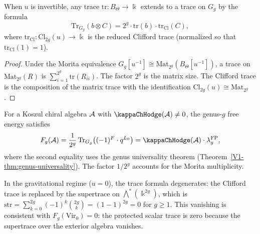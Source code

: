 \begin{proposition}
When $u$ is invertible, any trace $\mathrm{tr}\colon B_\Theta \to \Bbbk$
extends to a trace on $G_g$ by the formula
\begin{equation}%
\mathrm{Tr}_{G_g}(b \otimes C) =
2^g \cdot \mathrm{tr}(b) \cdot \mathrm{tr}_{\mathrm{Cl}}(C),
\end{equation}
where $\mathrm{tr}_{\mathrm{Cl}}\colon \mathrm{Cl}_{2g}(u)
\to \Bbbk$ is the reduced Clifford trace (normalized so that
$\mathrm{tr}_{\mathrm{Cl}}(1) = 1$).
\end{proposition}

\begin{proof}
Under the Morita equivalence
$G_g[u^{-1}] \cong \mathrm{Mat}_{2^g}(B_\Theta[u^{-1}])$, a trace on
$\mathrm{Mat}_{2^g}(R)$ is $\sum_{i=1}^{2^g}\mathrm{tr}(R_{ii})$.
The factor $2^g$ is the matrix size. The Clifford trace is the
composition of the matrix trace with the identification
$\mathrm{Cl}_{2g}(u) \cong \mathrm{Mat}_{2^g}$.
\end{proof}

\begin{corollary}
For a Koszul chiral algebra $\mathcal{A}$ with $\kappaChHodge(\cA) \neq 0$, the
genus-$g$ free energy satisfies
\begin{equation}%
F_g(\cA) = \frac{1}{2^g}\,\mathrm{Tr}_{G_g}\bigl(
(-1)^F \cdot q^{L_0}\bigr)
= \kappaChHodge(\cA) \cdot \lambda_g^{\mathrm{FP}},
\end{equation}
where the second equality uses the genus universality theorem
(Theorem~\ref{V1-thm:genus-universality}). The factor $1/2^g$ accounts
for the Morita multiplicity.
\end{corollary}

\begin{remark}[The partition function at $u = 0$]
In the gravitational regime ($u = 0$), the trace formula degenerates:
the Clifford trace is replaced by the supertrace on
$\bigwedge^*(\Bbbk^{2g})$, which is
$\mathrm{str} = \sum_{k=0}^{2g}(-1)^k\binom{2g}{k} =
(1-1)^{2g} = 0$ for $g \geq 1$. This vanishing is consistent with
$F_g(\mathrm{Vir}_0) = 0$: the protected scalar trace is zero because
the supertrace over the exterior algebra vanishes.
\end{remark}

